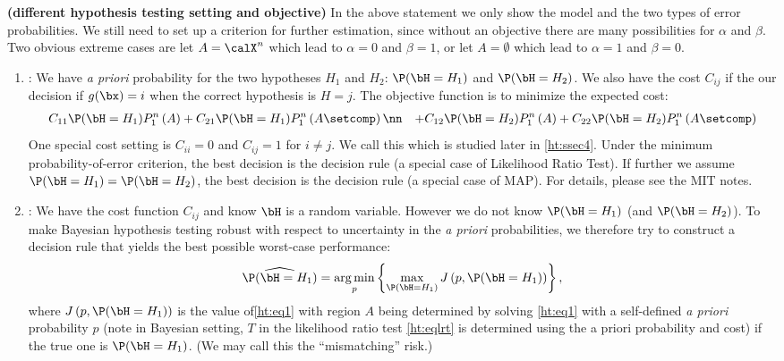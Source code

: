 \documentclass{article}
\newcommand{\bfs}[1]{\textbf{({#1})}}
\begin{document}
\begin{rema}{\bfs{different hypothesis testing setting and objective}}\label{ht:rema1} In the above statement we only show the model and the two types of error probabilities. We still need to set up a criterion for further estimation, since without an objective there are many possibilities for $\alpha$ and $\beta$. Two obvious extreme cases are let $A=\calX^n$ which lead to $\alpha=0$ and $\beta=1$, or let $A=\emptyset$ which lead to $\alpha=1$ and $\beta=0$. 
\begin{enumerate}
    \item {}: We have \emph{a priori} probability for the two hypotheses $H_1$ and $H_2$: $\P(\bH = H_1) $ and $\P(\bH = H_2)$. We also have the cost $C_{ij}$ if the our decision if $g(\bx)=i$ when the correct hypothesis is $H=j$. The objective function is to minimize the expected cost:
    \begin{align}
        &C_{11} \P(\bH = H_1)P_{1}^{n}\left(A\right) +  C_{21} \P(\bH = H_1)P_{1}^{n}\left(A\setcomp\right) \nn
        &+ C_{12} \P(\bH = H_2)P_{1}^{n}\left(A\right) +  C_{22} \P(\bH = H_2)P_{1}^{n}\left(A\setcomp\right) \label{ht:eq1}
    \end{align}
    One special cost setting is $C_{ii}= 0$ and $C_{ij}= 1$ for $i\ne j$. We call this   which is studied later in \cref{ht:ssec4}. Under the minimum probability-of-error criterion, the best decision is the   decision rule (a special case of Likelihood Ratio Test). If further we assume $\P(\bH = H_1)=\P(\bH = H_2)$, the best decision is the  decision rule (a special case of MAP). For details, please see the MIT notes.
    
    \item {}: We have the cost function $C_{ij}$ and know $\bH$ is a random variable. However we do not know  $\P(\bH = H_1) $ (and $\P(\bH = H_2)$). To make Bayesian hypothesis testing robust with respect to uncertainty in the \emph{a priori} probabilities, we therefore try to construct a decision rule that yields the best possible worst-case performance:
        \begin{align*}
            \widehat{\P(\bH = H_1)}=\underset{p}{\arg \min }\left\{\max _{\P(\bH = H_1)} J\left(p, \P(\bH = H_1)\right)\right\},
        \end{align*}
        where $J\left(p, \P(\bH = H_1)\right)$ is the value of\cref{ht:eq1} with region $A$ being determined by solving \cref{ht:eq1}  with a self-defined \emph{a priori} probability $p$ (note in  Bayesian setting, $T$ in the likelihood ratio test \cref{ht:eqlrt} is determined using the {a priori} probability and cost) if the true one is $\P(\bH = H_1)$. (We may call this the ``mismatching'' risk.)
        

\end{enumerate}
\end{rema}
\end{document}
